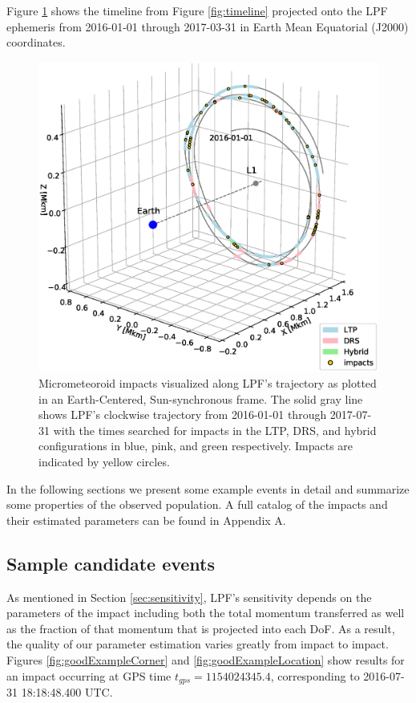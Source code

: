 \documentclass[twocolumn, trackchanges]{aastex62}
\begin{document}
Figure \ref{fig:ephemeris} shows the timeline from Figure \ref{fig:timeline} projected onto the LPF ephemeris from 2016-01-01 through 2017-03-31 in Earth Mean Equatorial (J2000) coordinates. 
\begin{figure}[t]
\includegraphics[width=\columnwidth]{figures/ephemeris.eps} 
\caption{Micrometeoroid impacts visualized along LPF's trajectory as plotted in an Earth-Centered, Sun-synchronous frame.  The solid gray line shows LPF's clockwise trajectory from 2016-01-01 through 2017-07-31 with the times searched for impacts in the LTP, DRS, and hybrid configurations in blue, pink, and green respectively. Impacts are indicated by yellow circles. \label{fig:ephemeris}}
\end{figure}

In the following sections we present some example events in detail and summarize some properties of the observed population.  A full catalog of the impacts and their estimated parameters can be found in Appendix A.

\subsection{Sample candidate events \label{sec:samples}}
As mentioned in Section \ref{sec:sensitivity}, LPF's sensitivity depends on the parameters of the impact including both the total momentum transferred as well as the fraction of that momentum that is  projected into each DoF.  As a result, the quality of our parameter estimation varies greatly from impact to impact.  Figures \ref{fig:goodExampleCorner} and \ref{fig:goodExampleLocation} show results for an impact occurring at GPS time $t_{gps}=1154024345.4$, corresponding to 2016-07-31 18:18:48.400 UTC. 
\end{document}
